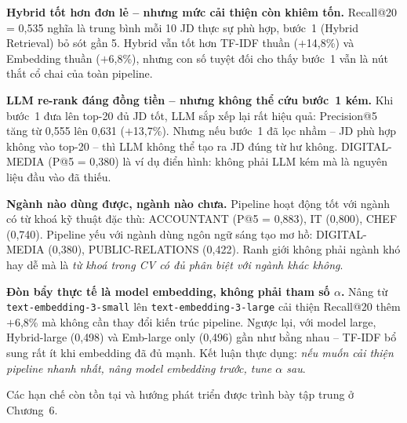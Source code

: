 \documentclass[../DoAn.tex]{subfiles}
\begin{document}
\textbf{Hybrid tốt hơn đơn lẻ -- nhưng mức cải thiện còn khiêm tốn.}
Recall@20 = 0{,}535 nghĩa là trung bình mỗi 10 JD thực sự phù hợp, bước~1 (Hybrid Retrieval)
bỏ sót gần 5. Hybrid vẫn tốt hơn TF-IDF thuần ($+$14{,}8\%) và Embedding
thuần ($+$6{,}8\%), nhưng con số tuyệt đối cho thấy bước~1 vẫn là nút thắt
cổ chai của toàn pipeline.

\textbf{LLM re-rank đáng đồng tiền -- nhưng không thể cứu bước~1 kém.}
Khi bước~1 đưa lên top-20 đủ JD tốt, LLM sắp xếp lại rất hiệu quả:
Precision@5 tăng từ 0{,}555 lên 0{,}631 ($+$13{,}7\%). Nhưng nếu bước~1 đã
lọc nhầm -- JD phù hợp không vào top-20 -- thì LLM không thể tạo ra JD đúng
từ hư không. DIGITAL-MEDIA (P@5 = 0{,}380) là ví dụ điển hình: không phải LLM
kém mà là nguyên liệu đầu vào đã thiếu.

\textbf{Ngành nào dùng được, ngành nào chưa.}
Pipeline hoạt động tốt với ngành có từ khoá kỹ thuật đặc thù:
ACCOUNTANT (P@5 = 0{,}883), IT (0{,}800), CHEF (0{,}740).
Pipeline yếu với ngành dùng ngôn ngữ sáng tạo mơ hồ:
DIGITAL-MEDIA (0{,}380), PUBLIC-RELATIONS (0{,}422).
Ranh giới không phải ngành khó hay dễ mà là \textit{từ khoá trong CV có đủ
phân biệt với ngành khác không}.

\textbf{Đòn bẩy thực tế là model embedding, không phải tham số $\alpha$.}
Nâng từ \texttt{text-embedding-3-small} lên \texttt{text-embedding-3-large}
cải thiện Recall@20 thêm $+$6{,}8\% mà không cần thay đổi kiến trúc pipeline.
Ngược lại, với model large, Hybrid-large (0{,}498) và Emb-large only (0{,}496)
gần như bằng nhau -- TF-IDF bổ sung rất ít khi embedding đã đủ mạnh.
Kết luận thực dụng: \textit{nếu muốn cải thiện pipeline nhanh nhất, nâng model
embedding trước, tune $\alpha$ sau}.

Các hạn chế còn tồn tại và hướng phát triển được trình bày tập trung ở Chương~6.
\end{document}
